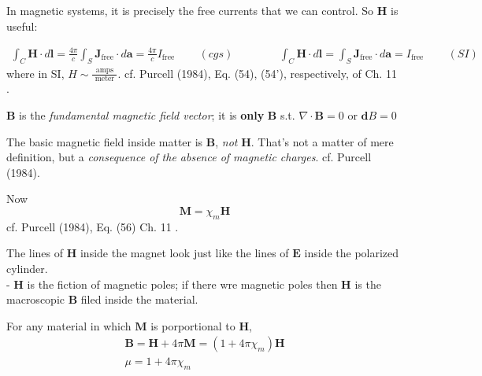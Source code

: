 \documentclass[10pt]{amsart}
\begin{document}
\begin{multicols*}{2}
In magnetic systems, it is precisely the free currents that we can control.  So $\mathbf{H}$ is useful:

\begin{equation}
\begin{gathered}
\int_C \mathbf{H} \cdot d\mathbf{l} = \frac{4\pi}{c}\int_S \mathbf{J}_{\text{free}} \cdot d\mathbf{a} = \frac{4\pi}{c} I_{\text{free}} \qquad \, (cgs) \qquad \qquad \, \int_C \mathbf{H} \cdot d\mathbf{l} = \int_S \mathbf{J}_{\text{free}} \cdot d\mathbf{a} =  I_{\text{free}} \qquad \, (SI)
\end{gathered}
\end{equation}
where in SI, $H \sim \frac{ \text{ amps } }{ \text{ meter } }$.  cf. Purcell (1984), Eq. (54), (54'), respectively, of Ch. 11 \cite{Purc1984}.  

$\mathbf{B}$ is the \emph{fundamental magnetic field vector}; it is \textbf{only} $\mathbf{B}$ s.t. $\nabla \cdot \mathbf{B} =0$ or $\mathbf{d}B=0$  

The basic magnetic field inside matter is $\mathbf{B}$, \emph{not} $\mathbf{H}$.  That's not a matter of mere definition, but a \emph{consequence of the absence of magnetic charges}.  cf. Purcell (1984)\cite{Purc1984}.   

Now 
\begin{equation}
\mathbf{M} = \chi_m \mathbf{H}
\end{equation}
cf. Purcell (1984), Eq. (56) Ch. 11 \cite{Purc1984}. 

The lines of $\mathbf{H}$ inside the magnet look just like the lines of $\mathbf{E}$ inside the polarized cylinder.   \\
- $\mathbf{H}$ is the fiction of magnetic poles; if there wre magnetic poles then $\mathbf{H}$ is the macroscopic $\mathbf{B}$ filed inside the material.  

For any material in which $\mathbf{M}$ is porportional to $\mathbf{H}$, 
\begin{equation}
\boxed{ 
\begin{gathered}
	\mathbf{B} = \mathbf{H} + 4\pi \mathbf{M} = (1+4\pi \chi_m) \mathbf{H} \\
\mu = 1 + 4\pi \chi_m
\end{gathered}
}
\end{equation}


\end{multicols*}
\end{document}
